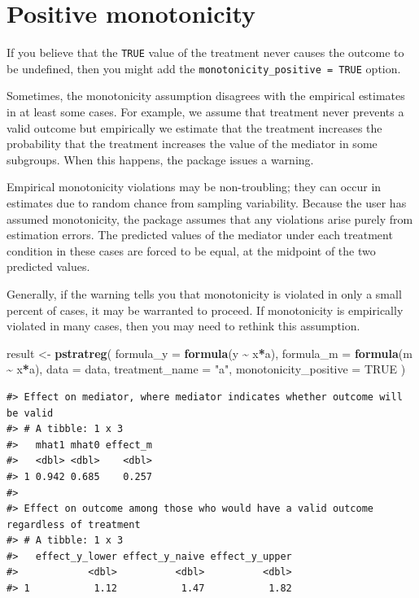 \documentclass[
]{book}
\newenvironment{Shaded}{\begin{snugshade}}{\end{snugshade}}
\newcommand{\AttributeTok}[1]{\textcolor[rgb]{0.13,0.29,0.53}{#1}}
\newcommand{\ConstantTok}[1]{\textcolor[rgb]{0.56,0.35,0.01}{#1}}
\newcommand{\FunctionTok}[1]{\textcolor[rgb]{0.13,0.29,0.53}{\textbf{#1}}}
\newcommand{\NormalTok}[1]{#1}
\newcommand{\OtherTok}[1]{\textcolor[rgb]{0.56,0.35,0.01}{#1}}
\newcommand{\SpecialCharTok}[1]{\textcolor[rgb]{0.81,0.36,0.00}{\textbf{#1}}}
\newcommand{\StringTok}[1]{\textcolor[rgb]{0.31,0.60,0.02}{#1}}
\begin{document}
\hypertarget{positive-monotonicity}{%
\section{Positive monotonicity}\label{positive-monotonicity}}

If you believe that the \texttt{TRUE} value of the treatment never causes the outcome to be undefined, then you might add the \texttt{monotonicity\_positive\ =\ TRUE} option.

Sometimes, the monotonicity assumption disagrees with the empirical estimates in at least some cases. For example, we assume that treatment never prevents a valid outcome but empirically we estimate that the treatment increases the probability that the treatment increases the value of the mediator in some subgroups. When this happens, the package issues a warning.

Empirical monotonicity violations may be non-troubling; they can occur in estimates due to random chance from sampling variability. Because the user has assumed monotonicity, the package assumes that any violations arise purely from estimation errors. The predicted values of the mediator under each treatment condition in these cases are forced to be equal, at the midpoint of the two predicted values.

Generally, if the warning tells you that monotonicity is violated in only a small percent of cases, it may be warranted to proceed. If monotonicity is empirically violated in many cases, then you may need to rethink this assumption.

\begin{Shaded}
\begin{Highlighting}[]
\NormalTok{result }\OtherTok{\textless{}{-}} \FunctionTok{pstratreg}\NormalTok{(}
  \AttributeTok{formula\_y =} \FunctionTok{formula}\NormalTok{(y }\SpecialCharTok{\textasciitilde{}}\NormalTok{ x}\SpecialCharTok{*}\NormalTok{a),}
  \AttributeTok{formula\_m =} \FunctionTok{formula}\NormalTok{(m }\SpecialCharTok{\textasciitilde{}}\NormalTok{ x}\SpecialCharTok{*}\NormalTok{a),}
  \AttributeTok{data =}\NormalTok{ data,}
  \AttributeTok{treatment\_name =} \StringTok{"a"}\NormalTok{,}
  \AttributeTok{monotonicity\_positive =} \ConstantTok{TRUE}
\NormalTok{)}
\end{Highlighting}
\end{Shaded}

\begin{verbatim}
#> Effect on mediator, where mediator indicates whether outcome will be valid
#> # A tibble: 1 x 3
#>   mhat1 mhat0 effect_m
#>   <dbl> <dbl>    <dbl>
#> 1 0.942 0.685    0.257
#> 
#> Effect on outcome among those who would have a valid outcome regardless of treatment
#> # A tibble: 1 x 3
#>   effect_y_lower effect_y_naive effect_y_upper
#>            <dbl>          <dbl>          <dbl>
#> 1           1.12           1.47           1.82
\end{verbatim}
\end{document}
